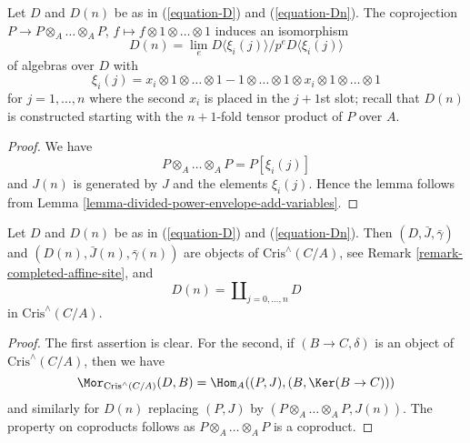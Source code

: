 \begin{lemma}
\label{lemma-structure-Dn}
Let $D$ and $D(n)$ be as in (\ref{equation-D}) and (\ref{equation-Dn}).
The coprojection $P \to P \otimes_A \ldots \otimes_A P$,
$f \mapsto f \otimes 1 \otimes \ldots \otimes 1$
induces an isomorphism
\begin{equation}
\label{equation-structure-Dn}
D(n) = \lim_e D\langle \xi_i(j) \rangle/p^eD\langle \xi_i(j) \rangle
\end{equation}
of algebras over $D$ with
$$
\xi_i(j) = x_i \otimes 1 \otimes \ldots \otimes 1 -
1 \otimes \ldots \otimes 1 \otimes x_i \otimes 1 \otimes \ldots \otimes 1
$$
for $j = 1, \ldots, n$ where the second $x_i$ is placed in the $j + 1$st
slot; recall that $D(n)$ is constructed starting with the
$n + 1$-fold tensor product of $P$ over $A$.
\end{lemma}

\begin{proof}
We have
$$
P \otimes_A \ldots \otimes_A P = P[\xi_i(j)]
$$
and $J(n)$ is generated by $J$ and the elements $\xi_i(j)$.
Hence the lemma follows from
Lemma \ref{lemma-divided-power-envelope-add-variables}.
\end{proof}

\begin{lemma}
\label{lemma-property-Dn}
Let $D$ and $D(n)$ be as in (\ref{equation-D}) and (\ref{equation-Dn}).
Then $(D, \bar J, \bar\gamma)$ and $(D(n), \bar J(n), \bar\gamma(n))$
are objects of $\text{Cris}^\wedge(C/A)$, see
Remark \ref{remark-completed-affine-site}, and
$$
D(n) = \coprod\nolimits_{j = 0, \ldots, n} D
$$
in $\text{Cris}^\wedge(C/A)$.
\end{lemma}

\begin{proof}
The first assertion is clear. For the second, if $(B \to C, \delta)$ is an
object of $\text{Cris}^\wedge(C/A)$, then we have
$$
\Mor_{\text{Cris}^\wedge(C/A)}(D, B) = 
\Hom_A((P, J), (B, \Ker(B \to C)))
$$
and similarly for $D(n)$ replacing $(P, J)$ by
$(P \otimes_A \ldots \otimes_A P, J(n))$. The property on coproducts follows
as $P \otimes_A \ldots \otimes_A P$ is a coproduct.
\end{proof}

